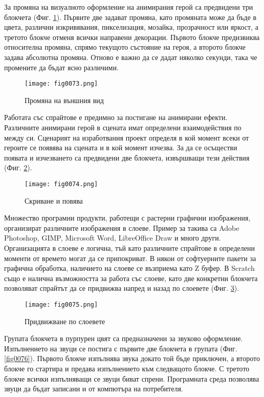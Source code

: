 За промяна на визуалното оформление на анимирания герой са предвидени три блокчета (Фиг. \ref{fig0073}). Първите две задават промяна, като промяната може да бъде в цвета, различни изкривявания, пикселизация, мозайка, прозрачност или яркост, а третото блокче отменя всички направени декорации. Първото блокче предизвиква относителна промяна, спрямо текущото състояние на героя, а второто блокче задава абсолютна промяна. Отново е важно да се дадат няколко секунди, така че промените да бъдат ясно различими. 

\begin{figure}[H]
  \centering
  \texttt{[image: fig0073.png]}
  \caption{Промяна на външния вид}
\label{fig0073}
\end{figure}

Работата със спрайтове е предимно за постигане на анимирани ефекти. Различните анимирани герой в сцената имат определени взаимодействия по между си. Сценарият на изработвания проект определя в кой момент всеки от героите се появява на сцената и в кой момент изчезва. За да се осъществи появата и изчезването са предвидени две блокчета, извършващи тези действия (Фиг. \ref{fig0074}).

\begin{figure}[H]
  \centering
  \texttt{[image: fig0074.png]}
  \caption{Скриване и повява}
\label{fig0074}
\end{figure}

Множество програмни продукти, работещи с растерни графични изображения, организират различните изображения в слоеве. Пример за такива са Adobe Photoshop, GIMP, Microsoft Word, LibreOffice Draw и много други. Организацията в слоеве е логична, тъй като различните спрайтове в определени моменти от времето могат да се припокриват. В някои от софтуерните пакети за графична обработка, наличието на слоеве се възприема като Z буфер. В Scratch също е налична възможността за работа със слоеве, като две конкретни блокчета позволяват спрайтът да се придвижва напред и назад по слоевете (Фиг. \ref{fig0075}).

\begin{figure}[H]
  \centering
  \texttt{[image: fig0075.png]}
  \caption{Придвижване по слоевете}
\label{fig0075}
\end{figure}

Групата блокчета в пурпурен цвят са предназначени за звуково оформление. Изпълнението на звуци се постига с първите две блокчета в групата (Фиг. \ref{fig0076}). Първото блокче изпълнява звука докато той бъде приключен, а второто блокче го стартира и предава изпълнението към следващото блокче. С третото блокче всички изпълняващи се звуци биват спрени. Програмната среда позволява звуци да бъдат записани и от компютъра на потребителя. 

